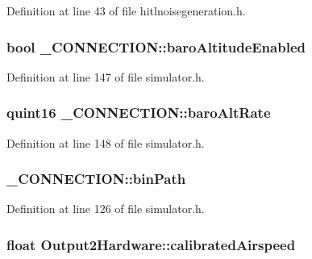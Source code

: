 \-Definition at line 43 of file hitlnoisegeneration.\-h.

\hypertarget{group___h_i_t_l_plugin_ga6700d3be0f4ef9211d6f34569034b7a8}{
\subsubsection[{baro\-Altitude\-Enabled}]{\setlength{\rightskip}{0pt plus 5cm}bool {\bf \-\_\-\-C\-O\-N\-N\-E\-C\-T\-I\-O\-N\-::baro\-Altitude\-Enabled}}}\label{group___h_i_t_l_plugin_ga6700d3be0f4ef9211d6f34569034b7a8}


\-Definition at line 147 of file simulator.\-h.

\hypertarget{group___h_i_t_l_plugin_gab5b66abe21b9a0f00b2dc2bbb28cac6c}{
\subsubsection[{baro\-Alt\-Rate}]{\setlength{\rightskip}{0pt plus 5cm}quint16 {\bf \-\_\-\-C\-O\-N\-N\-E\-C\-T\-I\-O\-N\-::baro\-Alt\-Rate}}}\label{group___h_i_t_l_plugin_gab5b66abe21b9a0f00b2dc2bbb28cac6c}


\-Definition at line 148 of file simulator.\-h.

\hypertarget{group___h_i_t_l_plugin_ga7bd6d35f193af2ec2365db4a4faaf7e7}{
\subsubsection[{bin\-Path}]{ {\bf \-\_\-\-C\-O\-N\-N\-E\-C\-T\-I\-O\-N\-::bin\-Path}}}\label{group___h_i_t_l_plugin_ga7bd6d35f193af2ec2365db4a4faaf7e7}


\-Definition at line 126 of file simulator.\-h.

\hypertarget{group___h_i_t_l_plugin_gaa6ec37dae61764737236528ba5a2445c}{
\subsubsection[{calibrated\-Airspeed}]{\setlength{\rightskip}{0pt plus 5cm}float {\bf \-Output2\-Hardware\-::calibrated\-Airspeed}}}\label{group___h_i_t_l_plugin_gaa6ec37dae61764737236528ba5a2445c}


